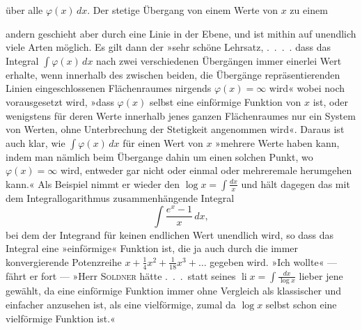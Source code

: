 über alle \(\varphi(x)\,dx\). Der stetige Übergang von einem Werte von \(x\) zu einem\par
\clearpage{}
\noindent andern geschieht aber durch eine Linie in der Ebene, und ist mithin auf unendlich
viele Arten möglich. Es gilt dann der »sehr schöne Lehrsatz, \mbox{.\ .\ .\ .}
dass das Integral \(\int\varphi(x)\,dx\) nach zwei verschiedenen Übergängen immer einerlei
Wert erhalte, wenn innerhalb des zwischen beiden, die Übergänge repräsentierenden
Linien eingeschlossenen Flächenraumes nirgends \(\varphi(x)=\infty\) wird«
wobei noch vorausgesetzt wird, »dass \(\varphi(x)\) selbst eine einförmige Funktion von
\(x\) ist, oder wenigstens für deren Werte innerhalb jenes ganzen Flächenraumes
nur ein System von Werten, ohne Unterbrechung der Stetigkeit angenommen
wird«. Daraus ist auch klar, wie \(\int\varphi(x)\,dx\) für einen Wert von \(x\) »mehrere
Werte haben kann, indem man nämlich beim Übergange dahin um einen solchen
Punkt, wo \(\varphi(x)=\infty\) wird, entweder gar nicht oder einmal oder mehreremale herumgehen kann.« Als Beispiel nimmt er wieder den \(\log x=\int\frac{dx}{x}\) und
hält dagegen das mit dem Integrallogarithmus zusammenhängende Integral
\[
\int\frac{e^x-1}{x}\,dx,
\]
bei dem der Integrand für keinen endlichen Wert unendlich wird, so dass
das Integral eine »einförmige« Funktion ist, die ja auch durch die immer
konvergierende Potenzreihe \(x+\frac14x^2+\frac1{18}x^3+\ldots\) gegeben wird. »Ich wollte«
— fährt er fort — »Herr \textsc{Soldner} hätte \mbox{.\ .\ .}\ statt seines \(\operatorname{li}x=\int\frac{dx}{\log x}\) lieber
jene gewählt, da eine einförmige Funktion immer ohne Vergleich als klassischer
und einfacher anzusehen ist, als eine vielförmige, zumal da \(\log x\) selbst
schon eine vielförmige Funktion ist.«\par

